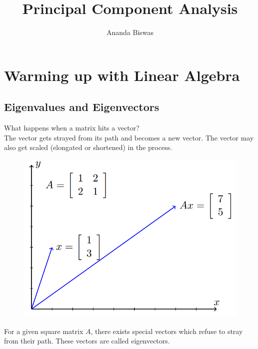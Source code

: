 \documentclass[11pt, a4paper]{article}
\title{Principal Component Analysis}
\author{Ananda Biswas}
\date{}
\begin{document}
\maketitle

\tableofcontents

\newpage

\section{Warming up with Linear Algebra}

\subsection{Eigenvalues and Eigenvectors}

\leftpointright \hspace{0.3cm} What happens when a matrix hits a vector? \\

\flushleft{\smallpencil} \hspace{0.2cm} The vector gets strayed from its path and becomes a new vector. The vector may also get scaled (elongated or shortened) in the process.

\begin{figure}[!htbp]

\centering

\includegraphics[scale=0.5]{image_1.png}

\end{figure}

For a given square matrix $A$, there exists special vectors which refuse to stray from their path. These vectors are called eigenvectors.
\end{document}
